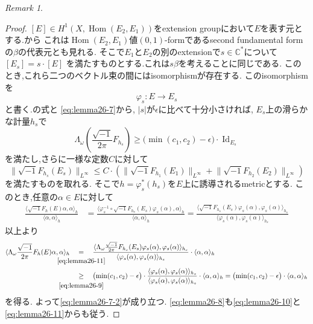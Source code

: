 \documentclass[dvipdfmx,a4paper,11pt]{article} %
\theoremstyle{definition}
\theoremstyle{remark}
\newtheorem{rem}[thm]{Remark}
\numberwithin{equation}{section}
\newcommand{\underalign}[2]{%
  \quad
  \underset{\mathclap{\raisebox{-1.6ex}{\ensuremath{\scriptstyle #1}}}}{#2}
  \quad
}
\begin{document}
\begin{rem}
\begin{proof}
$[E]\in H^1(X,\operatorname{Hom}(E_2,E_1))$をextension groupにおいて$E$を表す元とする.\cite[Section 11]{Dem12}から
これは$\operatorname{Hom}(E_2,E_1)$値$(0,1)$-formであるsecond fundamental formの$\beta$の代表元とも見れる. 
そこで$E_1$と$E_2$の別のextensionで$s\in\mathbb{C}^*$について
\(
[E_s]=s\cdot[E]
\)
を満たすものとする.これは$s \beta$を考えることに同じである. 
このとき,これら二つのベクトル束の間にはisomorphismが存在する. 
このisomorphismを
\[
\varphi_s\colon E\to E_s
\]
と書く.\cite[Equation (11.6)]{Dem12}の式と
\eqref{eq:lemma26-7}から, $\lvert s\rvert$が$\epsilon$に比べて十分小さければ, $E_s$上の滑らかな計量$h_s$で
\begin{equation}
\label{eq:lemma26-9}
\Lambda_{\omega}\left(\frac{\sqrt{-1}}{2 \pi}F_{h_s}\right)
\geq
\bigl(\min(c_1,c_2)-\epsilon\bigr)\cdot\operatorname{Id}_{E_s}
\end{equation}
を満たし,さらに一様な定数$C$に対して
\begin{equation}
\label{eq:lemma26-10}
\lVert\sqrt{-1} F_{h_s}(E_s)\rVert_{L^\infty}
\leq
C\cdot
\left(
\lVert\sqrt{-1} F_{h_1}(E_1)\rVert_{L^\infty}
+
\lVert\sqrt{-1} F_{h_2}(E_2)\rVert_{L^\infty}
\right)
\end{equation}
を満たすものを取れる. 
そこで$h=\varphi_s^*(h_s)$を$E$上に誘導されるmetricとする.
このとき,任意の$\alpha\in E$に対して
\begin{equation}
\label{eq:lemma26-11}
\begin{aligned}
\frac{\langle\sqrt{-1} F_h(E)\alpha,\alpha\rangle_h}{\langle\alpha,\alpha\rangle_h}
&=
\frac{\langle\varphi_s^{-1}\circ \sqrt{-1} F_{h_s}(E_s)\varphi_s(\alpha),\alpha\rangle_h}
{\langle\alpha,\alpha\rangle_h}
=
\frac{\langle \sqrt{-1} F_{h_s}(E_s)\varphi_s(\alpha),\varphi_s(\alpha)\rangle_{h_s}}
{\langle\varphi_s(\alpha),\varphi_s(\alpha)\rangle_{h_s}}
\end{aligned}
\end{equation}
以上より
\begin{equation*}
\begin{aligned}
\langle \Lambda_{\omega}\frac{\sqrt{-1}}{2\pi} F_h(E)\alpha,\alpha\rangle_h
&\underalign{\eqref{eq:lemma26-11}}{=}
\frac{\langle \Lambda_{\omega}\frac{\sqrt{-1}}{2\pi} F_{h_s}(E_s)\varphi_s(\alpha),\varphi_s(\alpha)\rangle_{h_s}}
{\langle\varphi_s(\alpha),\varphi_s(\alpha)\rangle_{h_s}}
\cdot\langle\alpha,\alpha\rangle_h
\\
&\underalign{\eqref{eq:lemma26-9}}{\geq}
\bigl(\min(c_1,c_2)-\epsilon\bigr)\cdot
\frac{\langle \varphi_s(\alpha),\varphi_s(\alpha)\rangle_{h_s}}
{\langle\varphi_s(\alpha),\varphi_s(\alpha)\rangle_{h_s}}
\cdot\langle\alpha,\alpha\rangle_h
=\bigl(\min(c_1,c_2)-\epsilon\bigr)\cdot\langle\alpha,\alpha\rangle_h
\end{aligned}
\end{equation*}
を得る. よって\eqref{eq:lemma26-7-2}が成り立つ. 
\eqref{eq:lemma26-8}も\eqref{eq:lemma26-10}と\eqref{eq:lemma26-11}からも従う.
\end{proof}

\end{rem}
\end{document}
